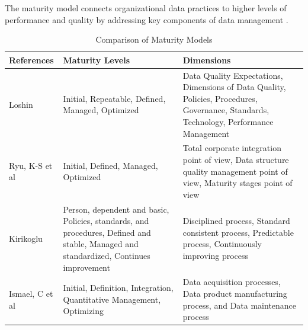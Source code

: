 \documentclass[conference]{IEEEtran}
\begin{document}
The maturity model connects organizational data practices to higher levels of performance and quality by addressing key components of data management \cite{loshin_dqi}. 



\begin{table}[H]
\caption{Comparison of Maturity Models}
\label{tab:comparison-dqm-part1}
\centering
\begin{tabular}{|p{1.5cm}|p{3cm}|p{3cm}|}
\hline
\textbf{References} & \textbf{Maturity Levels} & \textbf{Dimensions} \\ \hline
Loshin \cite{loshin_dqi} & Initial, Repeatable, Defined, Managed, Optimized & Data Quality Expectations, Dimensions of Data Quality, Policies, Procedures, Governance, Standards, Technology, Performance Management \\ \hline
Ryu, K-S et al \cite{ryu2006dqm} & Initial, Defined, Managed, Optimized & Total corporate integration point of view, Data structure quality management point of view, Maturity stages point of view \\ \hline
Kirikoglu \cite{kirikoglu2017dqm} & Person, dependent and basic, Policies, standards, and procedures, Defined and stable, Managed and standardized, Continues improvement & Disciplined process, Standard consistent process, Predictable process, Continuously improving process \\ \hline
Ismael, C et al \cite{ismael2003caldea} & Initial, Definition, Integration, Quantitative Management, Optimizing & Data acquisition processes, Data product manufacturing process, and Data maintenance process \\ \hline
\end{tabular}
\end{table}
\end{document}
